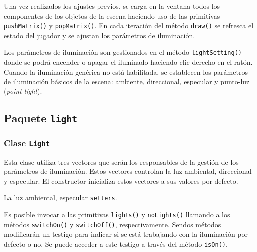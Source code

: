 \documentclass[10pt,a4paper]{report}
\begin{document}
	
	
	Una vez realizados los ajustes previos, se carga en la ventana todos los componentes de los objetos de la escena haciendo uso de las primitivas \texttt{pushMatrix()} y \texttt{popMatrix()}. En cada iteración del método \texttt{draw()} se refresca el estado del jugador y se ajustan los parámetros de iluminación.
	
	 
	
	Los parámetros de iluminación son gestionados en el método \texttt{lightSetting()} donde se podrá encender o apagar el iluminado haciendo clic derecho en el ratón. Cuando la iluminación genérica no está habilitada, se establecen los parámetros de iluminación básicos de la escena: ambiente, direccional, especular y punto-luz (\textit{point-light}).
	
	 
	
	\subsection{Paquete \texttt{light}}
	\subsubsection{Clase \texttt{Light}}
	Esta clase utiliza tres vectores que serán los responsables de la gestión de los parámetros de iluminación. Estos vectores controlan la luz ambiental, direccional y especular. El constructor inicializa estos vectores a sus valores por defecto.
	
	 
	
	La luz ambiental, especular \texttt{setters}.
	
	
	
	Es posible invocar a las primitivas \texttt{lights()} y \texttt{noLights()} llamando a los métodos \texttt{switchOn()} y \texttt{switchOff()}, respectivamente. Sendos métodos modificarán un testigo para indicar si se está trabajando con la iluminación por defecto o no. Se puede acceder a este testigo a través del método \texttt{isOn()}.
	
	
	
\end{document}
